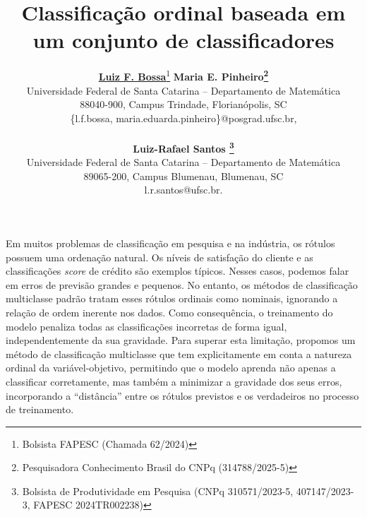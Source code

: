 \documentclass[a4,11pt]{article}
\begin{document}
\title{ \Large{\bf  Classificação ordinal baseada em um conjunto de classificadores} \\
}

\author{ {\bf \underline{\large Luiz F. Bossa}}\thanks{ Bolsista FAPESC (Chamada 62/2024)} \hspace*{1cm} {\bf {\large
 {Maria E. Pinheiro}\thanks{Pesquisadora Conhecimento Brasil do CNPq (314788/2025-5)
}}}  \\
 {\small Universidade Federal de Santa Catarina -- Departamento de Matemática} \\
 {\small 88040-900,  Campus Trindade,  Florianópolis, SC} \\
 {\small \{l.f.bossa, maria.eduarda.pinheiro\}@posgrad.ufsc.br,} \\ \\
 {\bf {\large Luiz-Rafael Santos }\thanks{Bolsista de Produtividade em Pesquisa (CNPq 310571/2023-5, 407147/2023-3, FAPESC 2024TR002238)}}  \\
 {\small Universidade Federal de Santa Catarina -- Departamento de Matemática} \\
 {\small 89065-200,  Campus Blumenau,  Blumenau, SC} \\
 {\small  l.r.santos@ufsc.br.} 
 \\[1ex]
 }

\thispagestyle{empty}
\date{}

\maketitle

Em muitos problemas de classificação em pesquisa e na indústria, os rótulos possuem uma ordenação natural. 
Os níveis de satisfação do cliente e as classificações \textit{score} de crédito são exemplos típicos. 
Nesses casos, podemos falar em erros de previsão grandes e pequenos. 
No entanto, os métodos de classificação multiclasse padrão tratam esses rótulos ordinais como nominais, ignorando a relação de ordem inerente nos dados. 
Como consequência, o treinamento do modelo penaliza todas as classificações incorretas de forma igual, independentemente da sua gravidade. 
Para superar esta limitação, propomos um método de classificação multiclasse que tem explicitamente em conta a natureza ordinal da variável-objetivo, permitindo que o modelo aprenda não apenas a classificar corretamente, mas também a minimizar a gravidade dos seus erros, incorporando a ``distância'' entre os rótulos previstos e os verdadeiros no processo de treinamento. 
\end{document}
